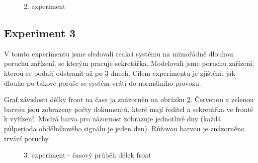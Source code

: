 \documentclass[12pt,a4paper]{article}
\begin{document}
\begin{figure}[ht]
 \begin{center}
    \caption{2. experiment }
    \label{exp2_histogram}
 \end{center}
\end{figure}

\subsection{Experiment 3}

V tomto experimentu jsme sledovali reakci systému na mimořádně dlouhou poruchu zařízení, se kterým pracuje sekretářka.
Modelovali jsme poruchu zařízení, kterou se podaří odstranit až po 3 dnech.
Cílem experimentu je zjištění, jak dlouho po takové poruše se systém vrátí do normálního provozu.

Graf závislosti délky front na čase ja znázorněn na obrázku \ref{exp3_graf}. Červenou a zelenou barvou jsou zobrazeny
počty dokumentů, které mají ředitel a sekretářka ve frontě k vyřízení. Modrá barva pro názornost zobrazuje jednotlivé
dny (každá půlperioda obdélníkového signálu je jeden den). Růžovou barvou je znázorněno trvání poruchy.

\begin{figure}[ht]
 \begin{center}
    \caption{3. experiment - časový průběh délek front}
    \label{exp3_graf}
 \end{center}
\end{figure}
\end{document}
